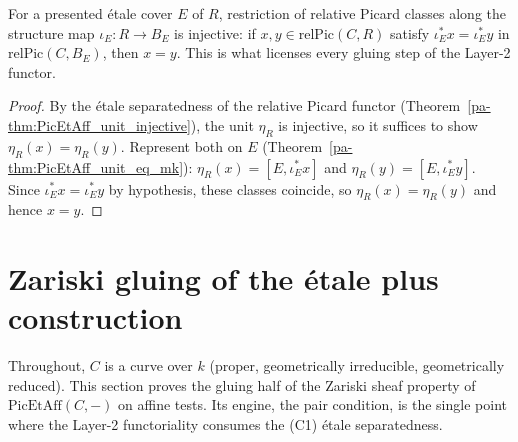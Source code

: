 \begin{theorem}
  \label{pa-thm:relPicAlgMap_injective_of_etaleCover}
  \leanok

  For a presented \'etale cover \(E\) of \(R\), restriction of relative Picard classes along the
  structure map \(\iota_E \colon R \to B_E\) is injective: if \(x, y \in \mathrm{relPic}(C, R)\)
  satisfy \(\iota_E^{*}x = \iota_E^{*}y\) in \(\mathrm{relPic}(C, B_E)\), then \(x = y\). This is
  what licenses every gluing step of the Layer-2 functor.
\end{theorem}
\begin{proof}
  \leanok
  By the \'etale separatedness of the relative Picard functor
  (Theorem~\ref{pa-thm:PicEtAff_unit_injective}), the unit \(\eta_R\) is injective, so it suffices to
  show \(\eta_R(x) = \eta_R(y)\). Represent both on \(E\) (Theorem~\ref{pa-thm:PicEtAff_unit_eq_mk}):
  \(\eta_R(x) = [E, \iota_E^{*}x]\) and \(\eta_R(y) = [E, \iota_E^{*}y]\). Since \(\iota_E^{*}x =
  \iota_E^{*}y\) by hypothesis, these classes coincide, so \(\eta_R(x) = \eta_R(y)\) and hence
  \(x = y\).
\end{proof}

\section{Zariski gluing of the \'etale plus construction}

Throughout, \(C\) is a curve over \(k\) (proper, geometrically irreducible, geometrically reduced).
This section proves the gluing half of the Zariski sheaf property of \(\mathrm{PicEtAff}(C, -)\) on
affine tests. Its engine, the pair condition, is the single point where the Layer-2 functoriality
consumes the (C1) \'etale separatedness.

